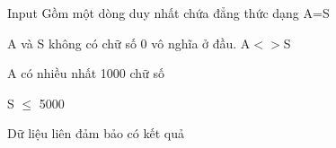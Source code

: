Input
Gồm một dòng duy nhất chứa đẳng thức dạng A=S  

   A và S không có chữ số 0 vô nghĩa ở đầu. A$<$$>$S  

   A có nhiều nhất 1000 chữ số  

   S $\le$ 5000  

   Dữ liệu liên đảm bảo có kết quả